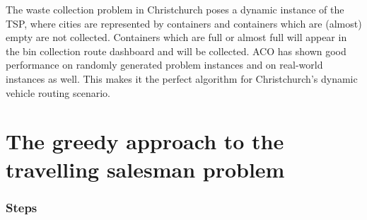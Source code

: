 \documentclass[10pt]{article}
\begin{document}

The waste collection problem in Christchurch poses a dynamic instance of the TSP, where cities are represented by containers and containers which are (almost) empty are not collected. Containers which are full or almost full will appear in the bin collection route dashboard and will be collected.
ACO has shown good performance on randomly generated problem instances and on real-world instances as well. This makes it the perfect algorithm for Christchurch's 
dynamic vehicle routing scenario.

\section{The greedy approach to the travelling salesman problem}
\label{sec:kpit}

\subsubsection*{Steps}
\end{document}
